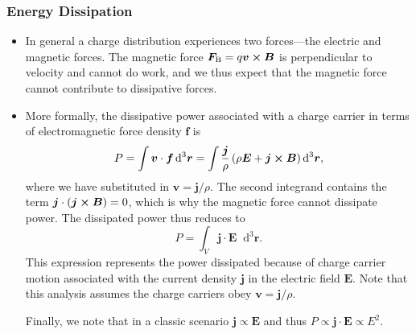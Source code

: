 \documentclass[11pt, a4paper]{article}
\newcommand{\diff}{\mathop{}\!\mathrm{d}} %
\newcommand{\dr}{\diff^{3} \r}  %
\renewcommand{\vec}[1]{\bm{#1}} %
\renewcommand{\r}{\vec{r}}
\newcommand{\E}{\vec{E}} %
\newcommand{\B}{\vec{B}} %
\renewcommand{\j}{\vec{j}}  %
\begin{document}
\subsubsection{Energy Dissipation}
\begin{itemize}
    \item In general a charge distribution experiences two forces---the electric and magnetic forces. The magnetic force $ \vec{F}_{\text{B}} = q \vec{v} \cross \B  $ is perpendicular to velocity and cannot do work, and we thus expect that the magnetic force cannot contribute to dissipative forces. 
	
	\item More formally, the dissipative power associated with a charge carrier in terms of electromagnetic force density $ \vec{f} $ is
	\begin{equation*}
		P = \int \vec{v} \cdot \vec{f} \dr = \int \frac{\j}{\rho} \left(\rho \E + \j \cross \B\right)\dr,
	\end{equation*}
	where we have substituted in $ \vec{v} = \j/\rho $. The second integrand contains the term $ \j \cdot (\j \cross \B) = 0 $, which is why the magnetic force cannot dissipate power. The dissipated power thus reduces to
	\begin{equation*}
		P = \int_{V} \j \cdot \E \dr.
	\end{equation*}
	This expression represents the power dissipated because of charge carrier motion associated with the current density $ \j $ in the electric field $ \E $. Note that this analysis assumes the charge carriers obey $ \vec{v} = \j / \rho $. 
	
    Finally, we note that in a classic scenario $ \j \propto \E $ and thus $ P \propto \j \cdot \E \propto E^{2} $. 
		
\end{itemize}
\end{document}
